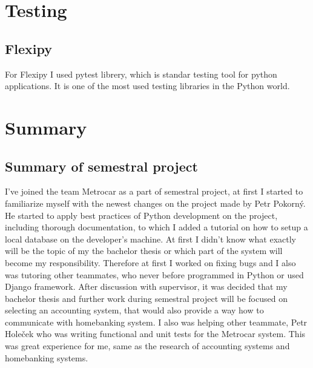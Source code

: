 \documentclass[11pt,twoside,a4paper]{book}
\begin{document}






\chapter{Testing}
\section{Flexipy}
For Flexipy I used pytest librery, which is standar testing tool for python applications. It is one of the most used testing libraries in the Python world. 

\chapter{Summary}
\section{Summary of semestral project}
I've joined the team Metrocar as a part of semestral project, at first I started to familiarize myself with the newest 
changes on the project made by Petr Pokorný. He started to apply best practices of Python development on the project, including thorough documentation, to which I added a tutorial on how to setup a local database on the developer's machine. At first I didn't know what exactly will be the topic of my the bachelor thesis or which part of the system will become my responsibility. Therefore at first I worked on fixing bugs and I also was tutoring other teammates, who never before programmed in Python or used Django framework. After discussion with supervisor, it was decided that my bachelor thesis and further work during semestral project will be focused on selecting an accounting system, that would also provide a way how to communicate with homebanking system. I also was helping other teammate, Petr Holeček who was writing functional and unit tests for the Metrocar system. This was great experience for me, same as the research of accounting systems and homebanking systems. 

 

\end{document}

